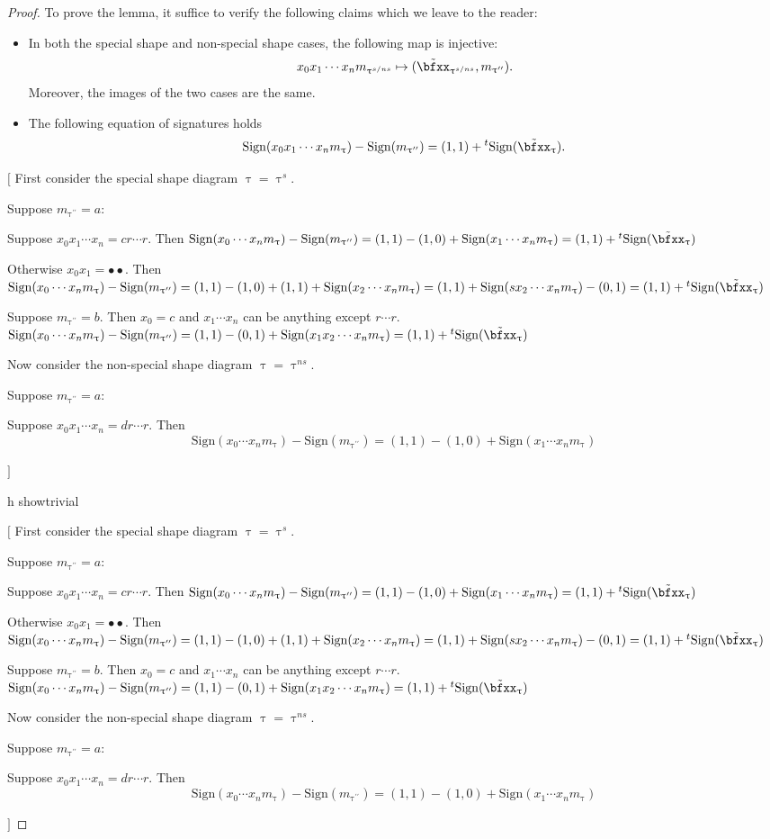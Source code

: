 \documentclass[12pt,a4paper]{amsart}
\newcommand{\trivial}[2][]{\if\relax\detokenize{#1}\relax
  {%
      \color{orange} \vspace{0em} $[$  #2 $]$
      \color{black}
  }
  \else
\ifx#1h
\ifcsname showtrivial\endcsname
{%
    \color{orange} \vspace{0em}  $[$ #2 $]$
    \color{black}
}
\fi
\else {\red Wrong argument!} \fi
\fi
}
\numberwithin{equation}{section}
\theoremstyle{remark}
\def\tsign{{}^t\mathrm{Sign}}
\def\ssign{\mathrm{Sign}}
\def\tbfxx{\tilde{\bfxx}}
\def\uptaupp{\uptau^{\prime\prime}}
\begin{document}
\begin{proof}
     To prove the lemma, it suffice to verify the following claims which we leave to the reader:
     \begin{itemize}
       \item In both the special shape and non-special shape cases, the
       following map is injective:
       \[
       x_{0}x_{1}\cdots x_{n}m_{\uptau^{s/ns}}\mapsto (\tbfxx_{\uptau^{s/ns}},m_{\uptaupp}).
       \]
        Moreover, the images of the two cases are the same.
       \item The following equation of signatures holds
       \[
         \ssign( x_{0}x_{1}\cdots x_{n}m_{\uptau} ) - \ssign(m_{\uptaupp})  = (1,1)+ \tsign(\tbfxx_{\uptau}).
       \]
     \end{itemize}

     \trivial[]{ First consider the special shape diagram $\uptau=\uptau^{s}$.
       \begin{enumPF}
         \item Suppose $m_{\uptaupp}=a$:
         \begin{enumPF}
           \item Suppose $x_{0}x_{1}\cdots x_{n}=cr\cdots r$. Then
           $\ssign(x_{0}\cdots x_{n}m_{\uptau})-\ssign(m_{\uptaupp})
           = (1,1)-(1,0)+\ssign(x_{1}\cdots x_{n}m_{\uptau}) = (1,1)+\tsign(\tbfxx_{\uptau})$
           \item Otherwise $x_{0}x_{1}=\bullet\bullet$. Then
           $\ssign(x_{0}\cdots x_{n}m_{\uptau})-\ssign(m_{\uptaupp})
           = (1,1)-(1,0)+(1,1)+\ssign(x_{2}\cdots x_{n}m_{\uptau})
           = (1,1)+\ssign(sx_{2}\cdots x_{n}m_{\uptau}) - (0,1) = (1,1)+\tsign(\tbfxx_{\uptau})$
         \end{enumPF}
         \item Suppose $m_{\uptaupp}= b$. Then $x_{0}=c$ and $x_{1}\cdots x_{n}$
         can be anything except $r\cdots r$.
         $\ssign(x_{0}\cdots x_{n}m_{\uptau})-\ssign(m_{\uptaupp})
         = (1,1)-(0,1)+\ssign(x_{1}x_{2}\cdots x_{n}m_{\uptau}) = (1,1)+\tsign(\tbfxx_{\uptau})$
       \end{enumPF}
       Now consider the non-special shape diagram $\uptau=\uptau^{ns}$.
       \begin{enumPF}
         \item Suppose $m_{\uptaupp}=a$:
         \begin{enumPF}
           \item Suppose $x_{0}x_{1}\cdots x_{n}=dr\cdots r$. Then
           \[\ssign(x_{0}\cdots x_{n}m_{\uptau})-\ssign(m_{\uptaupp}) = (1,1)-(1,0)+\ssign(x_{1}\cdots x_{n}m_{\uptau})
\]
\end{enumPF}
\end{enumPF}}
\end{proof}
\end{document}
